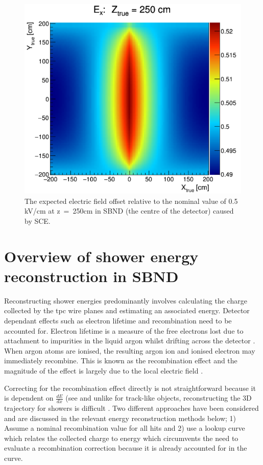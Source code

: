 \begin{figure}[h]
    \centering
    \includegraphics[width = \largefigwidth]{figures-chap4/SCE_map_SBND.png}
    \caption{The expected electric field offset relative to the nominal value of 0.5 kV/cm at z~=~250cm in SBND (the centre of the detector) caused by SCE.}
    \label{fig:SCE_map}
\end{figure}


\section{Overview of shower energy reconstruction in SBND}\label{subchap:shower reco overview}
Reconstructing shower energies predominantly involves calculating the charge collected by the \Gls{tpc} wire planes and estimating an associated energy. Detector dependant effects such as electron lifetime and recombination need to be accounted for. Electron lifetime is a measure of the free electrons lost due to attachment to impurities in the liquid argon whilst drifting across the detector \cite{ArgoNeuT_electron_lifetime_paper}. When argon atoms are ionised, the resulting argon ion and ionised electron may immediately recombine. This is known as the recombination effect and the magnitude of the effect is largely due to the local electric field \cite{ArgoNeuT_recombination_paper}. 

Correcting for the recombination effect directly is not straightforward because it is dependent on $\frac{dE}{dx}$ (see  and unlike for track-like objects, reconstructing the 3D trajectory for showers is difficult \cite{MicroBooNE_photon_Ereco_paper}. Two different approaches have been considered and are discussed in the relevant energy reconstruction methods below; 1) Assume a nominal recombination value for all hits and 2) use a lookup curve which relates the collected charge to energy which circumvents the need to evaluate a recombination correction because it is already accounted for in the curve.

